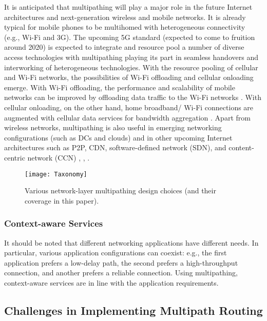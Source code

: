 \documentclass[10pt]{IEEEtran}
\begin{document}
It is anticipated that multipathing will play a major role in the future Internet architectures and next-generation wireless and mobile networks. It is already typical for mobile phones to be multihomed with heterogeneous connectivity (e.g., Wi-Fi and 3G). The upcoming 5G standard (expected to come to fruition around 2020) is expected to integrate and resource pool a number of diverse access technologies \cite{andrews2014will} with multipathing playing its part in seamless handovers and interworking of heterogeneous technologies. With the resource pooling of cellular and Wi-Fi networks, the possibilities of Wi-Fi offloading and cellular onloading emerge. With Wi-Fi offloading, the performance and scalability of mobile networks can be improved by offloading data traffic to the Wi-Fi networks \cite{gonzalez2013radio}. With cellular onloading, on the other hand,  home broadband/ Wi-Fi connections are augmented with cellular data services for bandwidth aggregation \cite{vallina2012david}. Apart from wireless networks, multipathing is also useful in emerging networking configurations (such as DCs and clouds) and in other upcoming Internet architectures such as P2P, CDN, software-defined network (SDN), and content-centric network (CCN) \cite{carofiglio2013multipath}, \cite{rossini2013evaluating}, \cite{tyson2012trace}. 

\begin{figure*}
\centering
\texttt{[image: Taxonomy]}
\caption{Various network-layer multipathing design choices (and their coverage in this paper).}
\label{fig:comrpro}
\end{figure*}

\vspace{1mm}
\subsubsection{Context-aware Services} It should be noted that different networking applications have different needs. In particular, various application configurations can coexist: e.g., the first application prefers a low-delay path, the second prefers a high-throughput connection, and another prefers a reliable connection. Using multipathing, context-aware services are in line with the application requirements.

\subsection{Challenges in Implementing Multipath Routing}
\label{subsec:ciimrou}
\end{document}
